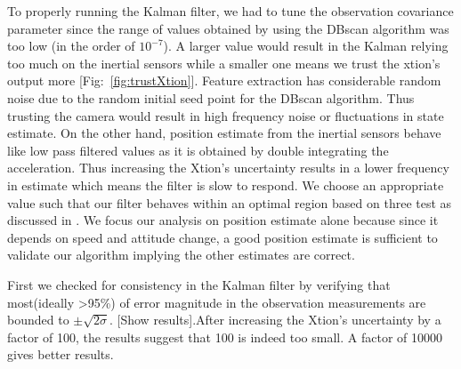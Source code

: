 \documentclass[]{article}
\begin{document}
{To properly running the Kalman filter, we had to tune the observation covariance parameter since the range of values obtained by using the DBscan algorithm was too low (in the order of $10^{-7}$). A larger value would result in the Kalman relying too much on the inertial sensors while a smaller one means we trust the xtion's output more [Fig:~\ref{fig:trustXtion}]. Feature extraction has considerable random noise due to the random initial seed point for the DBscan algorithm. Thus trusting the camera would result in high frequency noise or fluctuations in state estimate. On the other hand, position estimate from the inertial sensors behave like low pass filtered values as it is obtained by double integrating the acceleration. Thus increasing the Xtion's uncertainty results in a lower frequency in estimate which means the filter is slow to respond. We choose an appropriate value such that our filter behaves within an optimal region based on three test as discussed in \cite{KalmanTuning} . We focus our analysis on position estimate alone because since it depends on speed and attitude change, a good position estimate is sufficient to validate our algorithm implying the other estimates are correct. 

First we checked for consistency in the Kalman filter by verifying that most(ideally \textgreater 95\%) of error magnitude in the observation measurements are bounded to $\pm\sqrt{2\sigma}$. [Show results].After increasing the Xtion's uncertainty by a factor of 100, the results suggest that 100 is indeed too small. A factor of 10000 gives better results.

}
\end{document}
